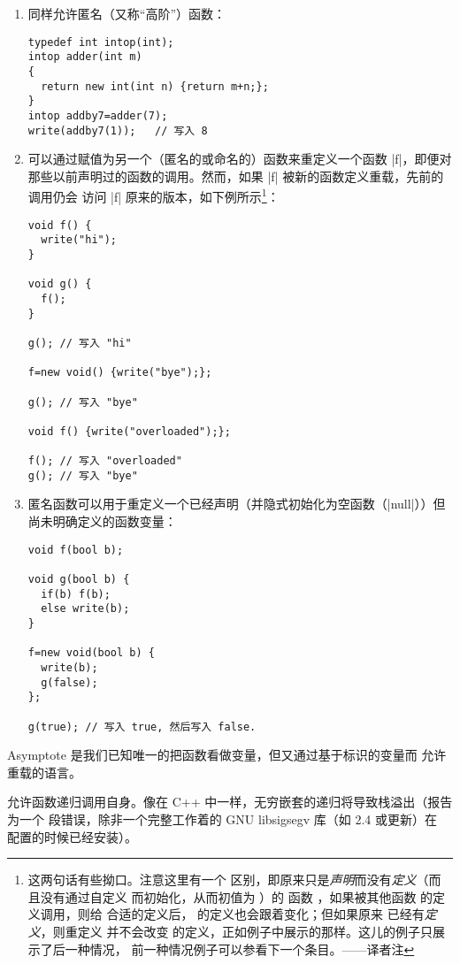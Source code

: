 \documentclass{ctexbook}
\newcommand*\prgname[1]{\textsf{#1}}
\newcommand\transnote[1]{\footnote{#1——译者注}}
\begin{document}
{{{\begin{enumerate}
\item 同样允许匿名（又称“高阶”）函数：
\begin{lstlisting}
typedef int intop(int);
intop adder(int m)
{
  return new int(int n) {return m+n;};
}
intop addby7=adder(7);
write(addby7(1));   // 写入 8
\end{lstlisting}

\item 可以通过赋值为另一个（匿名的或命名的）函数来重定义一个函数 |f|，即便对
那些以前声明过的函数的调用。然而，如果 |f| 被新的函数定义重载，先前的调用仍会
访问 |f| 原来的版本，如下例所示\transnote{这两句话有些拗口。注意这里有一个
区别，即原来只是\emph{声明}而没有\emph{定义}（而且没有通过自定义
\inlinecode{operator init()} 而初始化，从而初值为 \inlinecode{null}）的
函数 \inlinecode{f}，如果被其他函数 \inlinecode{g} 的定义调用，则给
\inlinecode{f} 合适的定义后，\inlinecode{g} 的定义也会跟着变化；但如果原来
\inlinecode{f} 已经有\emph{定义}，则重定义 \inlinecode{f} 并不会改变
\inlinecode{g} 的定义，正如例子中展示的那样。这儿的例子只展示了后一种情况，
前一种情况例子可以参看下一个条目。}：
\begin{lstlisting}
void f() {
  write("hi");
}

void g() {
  f();
}

g(); // 写入 "hi"

f=new void() {write("bye");};

g(); // 写入 "bye"

void f() {write("overloaded");};

f(); // 写入 "overloaded"
g(); // 写入 "bye"
\end{lstlisting}

\item 匿名函数可以用于重定义一个已经声明（并隐式初始化为空函数（|null|））但
尚未明确定义的函数变量：
\begin{lstlisting}
void f(bool b);

void g(bool b) {
  if(b) f(b);
  else write(b);
}

f=new void(bool b) {
  write(b);
  g(false);
};

g(true); // 写入 true, 然后写入 false.
\end{lstlisting}
\end{enumerate}

\prgname{Asymptote} 是我们已知唯一的把函数看做变量，但又通过基于标识的变量而
允许重载的语言。

允许函数递归调用自身。像在 C++ 中一样，无穷嵌套的递归将导致栈溢出（报告为一个
段错误，除非一个完整工作着的 GNU \prgname{libsigsegv} 库（如 2.4 或更新）在
配置的时候已经安装）。

}}}
\end{document}
